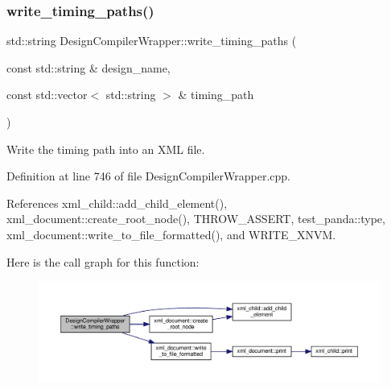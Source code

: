 \mbox{\label{classDesignCompilerWrapper_a06e7903a56b7f2dbd6476516a1310d65}} 
\subsubsection{\texorpdfstring{write\+\_\+timing\+\_\+paths()}{write\_timing\_paths()}}
{\footnotesize\ttfamily std\+::string Design\+Compiler\+Wrapper\+::write\+\_\+timing\+\_\+paths (\begin{DoxyParamCaption}\item[{const std\+::string \&}]{design\+\_\+name,  }\item[{const std\+::vector$<$ std\+::string $>$ \&}]{timing\+\_\+path }\end{DoxyParamCaption})\hspace{0.3cm}{\ttfamily [protected]}}



Write the timing path into an X\+ML file. 



Definition at line 746 of file Design\+Compiler\+Wrapper.\+cpp.



References xml\+\_\+child\+::add\+\_\+child\+\_\+element(), xml\+\_\+document\+::create\+\_\+root\+\_\+node(), T\+H\+R\+O\+W\+\_\+\+A\+S\+S\+E\+RT, test\+\_\+panda\+::type, xml\+\_\+document\+::write\+\_\+to\+\_\+file\+\_\+formatted(), and W\+R\+I\+T\+E\+\_\+\+X\+N\+VM.

Here is the call graph for this function\+:
\nopagebreak
\begin{figure}[H]
\begin{center}
\leavevmode
\includegraphics[width=350pt]{d5/d55/classDesignCompilerWrapper_a06e7903a56b7f2dbd6476516a1310d65_cgraph}
\end{center}
\end{figure}


